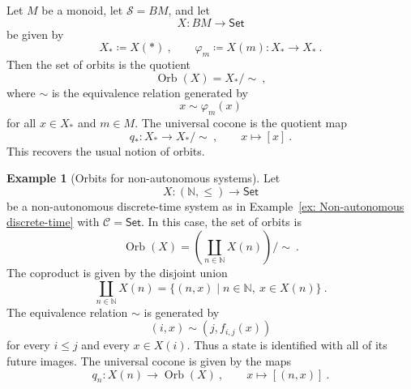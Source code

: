 \documentclass[a4paper,reqno,oneside]{amsart}
\theoremstyle{definition}
\newtheorem{example}[theorem]{Example}
\theoremstyle{remark}
\newcommand{\N}{\mathbb{N}}
\numberwithin{equation}{section}
\begin{document}
	
	Let $M$ be a monoid, let $\mathcal S=BM$, and let
	\begin{equation}
		X\colon BM\to\mathsf{Set}
	\end{equation}
	be given by
	\begin{equation}
		X_*\coloneqq X(*) \ ,
		\qquad
		\varphi_m\coloneqq X(m)\colon X_*\to X_* \ .
	\end{equation}
	Then the set of orbits is the quotient
	\begin{equation}
		\operatorname{Orb}(X)
		=
		X_* /{\sim} \ ,
	\end{equation}
	where $\sim$ is the equivalence relation generated by
	\begin{equation}
		x\sim \varphi_m(x)
	\end{equation}
	for all $x\in X_*$ and $m\in M$. The universal cocone is the quotient map
	\begin{equation}
		q_*\colon X_*\longrightarrow X_* /{\sim} \ ,
		\qquad
		x\longmapsto [x] \ .
	\end{equation}
	This recovers the usual notion of orbits.
	
	
	
	
	
	
	
	
	
	\begin{example}[Orbits for non-autonomous systems]
		Let
		\begin{equation}
			X\colon (\N,\leq)\longrightarrow \mathsf{Set}
		\end{equation}
		be a non-autonomous discrete-time system as in
		Example~\ref{ex: Non-autonomous discrete-time} with $\mathcal C = \mathsf{Set}$. In this case, the set of orbits is
		\begin{equation}
			\operatorname{Orb}(X)
			= \left(\coprod_{n\in\N}X(n)\right)\big/{\sim} \ .
		\end{equation}
		The coproduct is given by the disjoint union
		\begin{equation}
			\coprod_{n\in\N}X(n)
			=
			\{(n,x)\mid n\in\N,\ x\in X(n)\} \ .
		\end{equation}
		The equivalence relation $\sim$ is generated by
		\begin{equation}
			(i,x)\sim (j,f_{i,j}(x))
		\end{equation}
		for every $i\leq j$ and every $x\in X(i)$. Thus a state is identified with
		all of its future images. The universal cocone is given by the maps
		\begin{equation}
			q_n\colon X(n)\longrightarrow \operatorname{Orb}(X) \ ,
			\qquad
			x\longmapsto [(n,x)] \ .
		\end{equation}
	\end{example}
	
\end{document}
